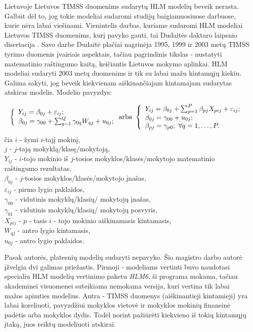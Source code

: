\documentclass[12pt,a4paper]{article}
\begin{document}
\indent Lietuvoje Lietuvos TIMSS duomenims sudarytų HLM modelių beveik nerasta. Galbūt dėl to, jog tokie modeliai sudaromi studijų baigiamuosiuose darbuose, kurie nėra labai viešinami. Vienintelis darbas, kuriame sudaromi HLM modeliai Lietuvos TIMSS duomenims, kurį pavyko gauti, tai Dudaitės daktaro laipsnio disertacija \cite{liet2003}. Savo darbe Dudaitė plačiai nagrinėja 1995, 1999 ir 2003 metų TIMSS tyrimo duomenis įvairiais aspektais, tačiau pagrindinis tikslas - nustatyti matematinio raštingumo kaitą, keičiantis Lietuvos mokymo aplinkai. HLM modeliai sudaryti 2003 metų duomenims ir tik su labai mažu kintamųjų kiekiu. Galima sakyti, jog beveik kiekvienam aiškinančiajam kintamajam sudarytas atskiras modelis. Modelio pavyzdys:
\begin{small}
\[
\left\{
\begin{array}{l l}
Y_{ij} = \beta_{0j}+\varepsilon_{ij}; \\
\beta_{0j} = \gamma_{00} + \sum^Q_{q=1}\gamma_{0q}W_{qj}+u_{0j};
\end{array} \right.
\text{arba}\
\left\{
\begin{array}{l l}
Y_{ij} = \beta_{0j}+\sum^P_{p=1}\beta_{pj}X_{pij}+\varepsilon_{ij}; \\
\beta_{0j} = \gamma_{00} + u_{0j};\\
\beta_{pj} = \gamma_{p0}; \ \forall q=1,\dots,P.
\end{array} \right.
\]
čia $i$ - žymi $i$-tajį mokinį,\\
$j$ - $j$-tają mokyklą/klasę/mokytoją,\\
$Y_{ij}$ - $i$-tojo mokinio iš $j$-tosios mokyklos/klasės/mokytojo matematinio raštingumo rezultatas,\\
$\beta_{0j}$ - $j$-tosios mokyklos/klasės/mokytojo įnašas,\\
$\varepsilon_{ij}$ - pirmo lygio paklaidos,\\
$\gamma_{00}$ - vidutinis mokyklų/klasių/ mokytojų įnašas,\\
$\gamma_{01}$ - vidutinis mokyklų/klasių/ mokytojų posvyris,\\
$X_{pij}$ - $p$ - tasis $i$ - tojo mokinio aiškinamasis kintamasis,\\
$W_{qj}$ - antro lygio kintamasis, \\
$u_{0j}$ - antro lygio paklaidos.
\end{small}

\indent Pasak autorės, platesnių modelių sudaryti nepavyko. Šio magistro darbo autorė įžvelgia dvi galimas priežastis. Pirmoji - modeliams vertinti buvo naudotasi specialiu HLM modelių vertinimo paketu \textit{HLM6}, ši programa mokama, tačiau akademinei visuomenei suteikiama nemokama versija, kuri vertina tik labai mažos apimties modelius. Antra - TIMSS duomenys (aiškinantieji kintamieji) yra labai koreliuoti, pavyzdžiui mokyklos vietovė ir mokyklos mokinių finansinė padėtis arba mokyklos dydis. Todėl norint pažiūrėti kiekvieno iš tokių kintamųjų įtaką, juos reiktų modeliuoti atskirai.
\end{document}
